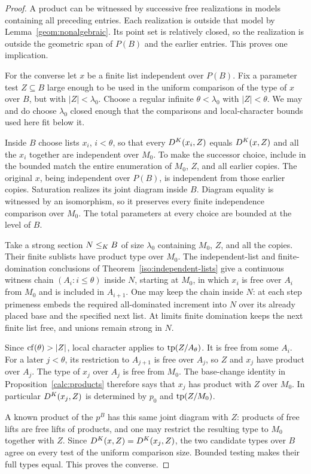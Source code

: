 \begin{proof}
A product can be witnessed by successive free realizations in models
containing all preceding entries.  Each realization is outside that
model by Lemma~\ref{geom:nonalgebraic}.  Its point set is relatively
closed, so the realization is outside the geometric span of $P(B)$
and the earlier entries.  This proves one implication.

For the converse let $x$ be a finite list independent over $P(B)$.
Fix a parameter test $Z\subseteq B$ large enough to be used in the
uniform comparison of the type of $x$ over $B$, but with
$|Z|<\lambda_0$.  Choose a regular infinite $\theta<\lambda_0$
with $|Z|<\theta$.  We may and do choose $\lambda_0$ closed enough
that the comparisons and local-character bounds used here fit below
it.

Inside $B$ choose lists $x_i$, $i<\theta$, so that every
$D^K(x_i,Z)$ equals $D^K(x,Z)$ and all the $x_i$ together are
independent over $M_0$.  To make the successor choice, include in the
bounded match the entire enumeration of $M_0$, $Z$, and all earlier
copies.  The original $x$, being independent over $P(B)$, is independent
from those earlier copies.  Saturation realizes its joint diagram
inside $B$.  Diagram equality is witnessed by an isomorphism, so it
preserves every finite independence comparison over $M_0$.  The total
parameters at every choice are bounded at the level of $B$.

Take a strong section $N\leq_K B$ of size $\lambda_0$ containing
$M_0$, $Z$, and all the copies.  Their finite sublists have product
type over $M_0$.  The independent-list and finite-domination
conclusions of Theorem~\ref{iso:independent-lists} give a continuous
witness chain $(A_i:i\leq\theta)$ inside $N$, starting at $M_0$, in
which $x_i$ is free over $A_i$ from $M_0$ and is included in
$A_{i+1}$.  One may keep the chain inside $N$: at each step primeness
embeds the required all-dominated increment into $N$ over its already
placed base and the specified next list.  At limits finite domination
keeps the next finite list free, and unions remain strong in $N$.

Since $\operatorname{cf}(\theta)>|Z|$, local character applies to $\operatorname{tp}(Z/A_\theta)$.
It is free from some $A_i$.  For a later $j<\theta$, its restriction
to $A_{j+1}$ is free over $A_j$, so $Z$ and $x_j$ have product over
$A_j$.  The type of $x_j$ over $A_j$ is free from $M_0$.
The base-change identity in Proposition~\ref{calc:products} therefore
says that $x_j$ has product with $Z$ over $M_0$.  In particular
$D^K(x_j,Z)$ is determined by $p_0$ and $\operatorname{tp}(Z/M_0)$.

A known product of the $p^B$ has this same joint diagram with $Z$:
products of free lifts are free lifts of products, and one may
restrict the resulting type to $M_0$ together with $Z$.  Since
$D^K(x,Z)=D^K(x_j,Z)$, the two candidate types over $B$ agree on
every test of the uniform comparison size.  Bounded testing makes
their full types equal.  This proves the converse.
\end{proof}

